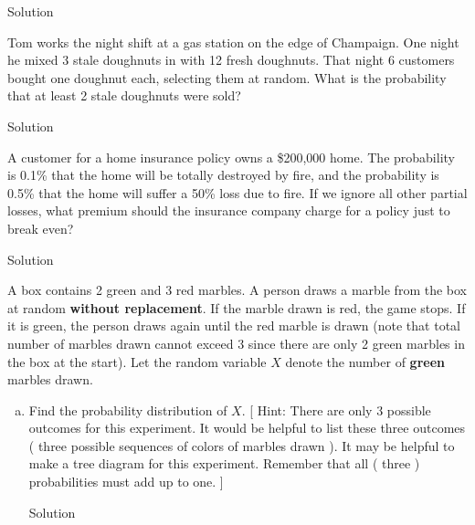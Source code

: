 \documentclass{article}
\begin{document}
\begin{spacing}{1.1}
\begin{homeworkProblem}
\begin{enumerate}[(a)]
\begin{homeworkSection}{Solution}
			\end{homeworkSection}	
	\end{enumerate}
\end{homeworkProblem}
\begin{homeworkProblem}
	Tom works the night shift at a gas station on the edge of Champaign. One night he mixed 3 stale doughnuts in with 12 fresh doughnuts. That night 6 customers bought one doughnut each, selecting them at random. What is the probability that at least 2 stale doughnuts were sold?
	\begin{homeworkSection}{Solution}
		
	\end{homeworkSection}
\end{homeworkProblem}
\begin{homeworkProblem}
	A customer for a home insurance policy owns a \$200,000 home. The probability is 0.1\% that the home will be totally destroyed by fire, and the probability is 0.5\% that
the home will suffer a 50\% loss due to fire. If we ignore all other partial losses, what premium should the insurance company charge for a policy just to break even?
	\begin{homeworkSection}{Solution}
		
	\end{homeworkSection}
\end{homeworkProblem}
\begin{homeworkProblem}
	A box contains 2 green and 3 red marbles. A person draws a marble from the box at random {\bf without replacement}. If the marble drawn is red, the game stops. If it is green, the person draws again until the red marble is drawn (note that total number of marbles drawn cannot exceed 3 since there are only 2 green marbles in the box at the start). Let the random variable $X$ denote the number of {\bf green} marbles drawn.
	\begin{enumerate}[(a)]
		\item Find the probability distribution of $X$. [ Hint: There are only 3 possible outcomes for this experiment. It would be helpful to list these three outcomes ( three possible sequences of colors of marbles drawn ). It may be helpful to make a tree diagram for this experiment. Remember that all ( three ) probabilities must add up to one. ]
			\begin{homeworkSection}{Solution}
		

\end{homeworkSection}
\end{enumerate}
\end{homeworkProblem}
\end{spacing}
\end{document}
